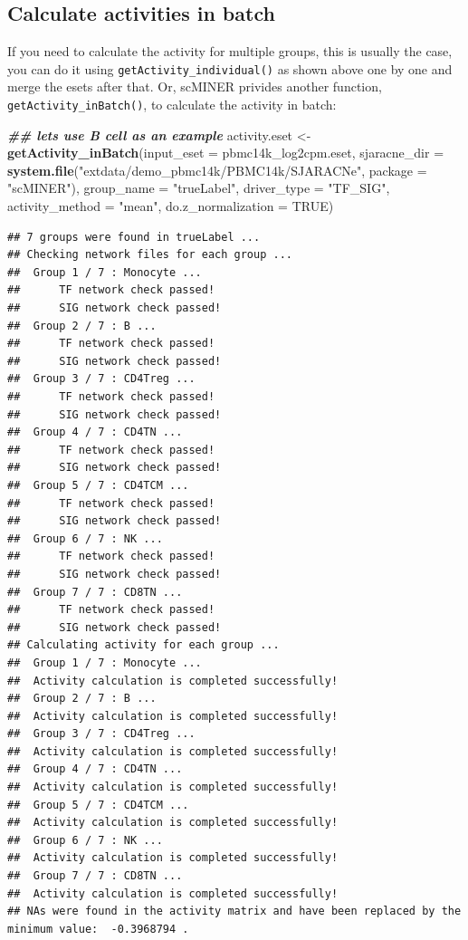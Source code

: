 \documentclass[
  12pt,
]{book}
\newenvironment{Shaded}{\begin{snugshade}}{\end{snugshade}}
\newcommand{\AttributeTok}[1]{\textcolor[rgb]{0.13,0.29,0.53}{#1}}
\newcommand{\ConstantTok}[1]{\textcolor[rgb]{0.56,0.35,0.01}{#1}}
\newcommand{\DocumentationTok}[1]{\textcolor[rgb]{0.56,0.35,0.01}{\textbf{\textit{#1}}}}
\newcommand{\FunctionTok}[1]{\textcolor[rgb]{0.13,0.29,0.53}{\textbf{#1}}}
\newcommand{\NormalTok}[1]{#1}
\newcommand{\OtherTok}[1]{\textcolor[rgb]{0.56,0.35,0.01}{#1}}
\newcommand{\StringTok}[1]{\textcolor[rgb]{0.31,0.60,0.02}{#1}}
\begin{document}
\subsection{Calculate activities in batch}\label{calculate-activities-in-batch}

If you need to calculate the activity for multiple groups, this is usually the case, you can do it using \texttt{getActivity\_individual()} as shown above one by one and merge the esets after that. Or, scMINER privides another function, \texttt{getActivity\_inBatch()}, to calculate the activity in batch:

\begin{Shaded}
\begin{Highlighting}[]
\DocumentationTok{\#\# let\textquotesingle{}s use B cell as an example}
\NormalTok{activity.eset }\OtherTok{\textless{}{-}} \FunctionTok{getActivity\_inBatch}\NormalTok{(}\AttributeTok{input\_eset =}\NormalTok{ pbmc14k\_log2cpm.eset, }\AttributeTok{sjaracne\_dir =} \FunctionTok{system.file}\NormalTok{(}\StringTok{"extdata/demo\_pbmc14k/PBMC14k/SJARACNe"}\NormalTok{, }\AttributeTok{package =} \StringTok{"scMINER"}\NormalTok{),  }\AttributeTok{group\_name =} \StringTok{"trueLabel"}\NormalTok{, }\AttributeTok{driver\_type =} \StringTok{"TF\_SIG"}\NormalTok{, }\AttributeTok{activity\_method =} \StringTok{"mean"}\NormalTok{, }\AttributeTok{do.z\_normalization =} \ConstantTok{TRUE}\NormalTok{)}
\end{Highlighting}
\end{Shaded}

\begin{verbatim}
## 7 groups were found in trueLabel ...
## Checking network files for each group ...
##  Group 1 / 7 : Monocyte ...
##      TF network check passed!
##      SIG network check passed!
##  Group 2 / 7 : B ...
##      TF network check passed!
##      SIG network check passed!
##  Group 3 / 7 : CD4Treg ...
##      TF network check passed!
##      SIG network check passed!
##  Group 4 / 7 : CD4TN ...
##      TF network check passed!
##      SIG network check passed!
##  Group 5 / 7 : CD4TCM ...
##      TF network check passed!
##      SIG network check passed!
##  Group 6 / 7 : NK ...
##      TF network check passed!
##      SIG network check passed!
##  Group 7 / 7 : CD8TN ...
##      TF network check passed!
##      SIG network check passed!
## Calculating activity for each group ...
##  Group 1 / 7 : Monocyte ...
##  Activity calculation is completed successfully!
##  Group 2 / 7 : B ...
##  Activity calculation is completed successfully!
##  Group 3 / 7 : CD4Treg ...
##  Activity calculation is completed successfully!
##  Group 4 / 7 : CD4TN ...
##  Activity calculation is completed successfully!
##  Group 5 / 7 : CD4TCM ...
##  Activity calculation is completed successfully!
##  Group 6 / 7 : NK ...
##  Activity calculation is completed successfully!
##  Group 7 / 7 : CD8TN ...
##  Activity calculation is completed successfully!
## NAs were found in the activity matrix and have been replaced by the minimum value:  -0.3968794 .
\end{verbatim}
\end{document}
